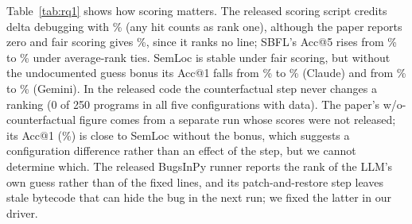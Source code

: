 Table~\ref{tab:rq1} shows how scoring matters. The released scoring script credits delta debugging with
\RqOneDdAuthorAllAccOne\% (any hit counts as rank one), although the paper reports zero and fair scoring gives
\RqOneDdFairAllAccOne\%, since it ranks no line; SBFL's Acc@5 rises from \RqOneSbflOchiaiAuthorAllAccFive\% to
\RqOneSbflOchiaiFairAllAccFive\% under average-rank ties. SemLoc is stable under fair scoring, but without the
undocumented guess bonus its Acc@1 falls from \RqOneSemlocClaudeTZeroEightFairAllAccOne\% to
\RqOneSemlocClaudeTZeroEightNoPriorFairAllAccOne\% (Claude) and from \RqOneSemlocGeminiTZeroEightFairAllAccOne\% to
\RqOneSemlocGeminiTZeroEightNoPriorFairAllAccOne\% (Gemini). In the released code the counterfactual step never changes a
ranking (0 of 250 programs in all five configurations with data). The paper's w/o-counterfactual figure comes from a
separate run whose scores were not released; its Acc@1 (\RqOneCfDisabledClaudeTZeroEightAuthorAllAccOne\%) is close to
SemLoc without the bonus, which suggests a configuration difference rather than an effect of the step, but we cannot
determine which. The released BugsInPy runner reports the rank of the LLM's own guess rather than of the fixed lines, and
its patch-and-restore step leaves stale bytecode that can hide the bug in the next run; we fixed the latter in our driver.

\begin{table}[!t]
\centering
\caption{Published configurations under the authors' and fair scoring (released logs, 250 programs)}
\label{tab:rq1}
\resizebox{\columnwidth}{!}{}
\end{table}

